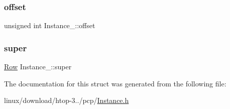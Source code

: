 \mbox{\label{structInstance___aed507087511c6c6a69902d6e698978ec}} 
\subsubsection{\texorpdfstring{offset}{offset}}
{\footnotesize\ttfamily unsigned int Instance\+\_\+\+::offset}

\mbox{\label{structInstance___a13366eeb6c85eb2bd4011aab8e0c6665}} 
\subsubsection{\texorpdfstring{super}{super}}
{\footnotesize\ttfamily \hyperlink{Row_8h_a54193344854aa79a97448ca03062e70c}{Row} Instance\+\_\+\+::super}



The documentation for this struct was generated from the following file\+:\begin{DoxyCompactItemize}
\item 
linux/download/htop-\/3../pcp/\hyperlink{Instance_8h}{Instance.\+h}\end{DoxyCompactItemize}
